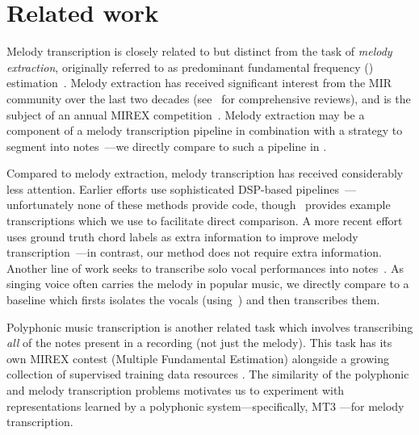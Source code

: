 \section{Related work}\label{sec:related}

Melody transcription is closely related to but distinct from the task of \emph{melody extraction}, originally referred to as predominant fundamental frequency (\fnot) estimation~\cite{goto1999real,goto2004real}. 
Melody extraction has received significant interest from the MIR community over the last two decades (see~\cite{salamon2014melody,rao2022melody} for comprehensive reviews), 
and is the subject of an annual MIREX competition~\cite{downie2014ten}. 
Melody extraction may be a component of a melody transcription pipeline in combination with a strategy to segment \fnot{} into notes~\cite{salamon2015midi,nishikimi2016musical,nishikimi2017scale}---we directly compare to such a pipeline in .

Compared to melody extraction, melody transcription has received considerably less attention. 
Earlier efforts use sophisticated DSP-based pipelines~\cite{paiva2004auditory,paiva2005detection,ryynanen2008automatic,weil2009automatic}---unfortunately none of these methods provide code, though~\cite{ryynanen2008automatic} provides example transcriptions which we use to facilitate direct comparison. 
A more recent effort uses ground truth chord labels as extra information to improve melody transcription~\cite{laaksonen2014automatic}---in contrast, our method does not require extra information. 
Another line of work seeks to transcribe solo vocal performances into notes~\cite{mauch2015computer,nishikimi2020bayesian,nishikimi2021audio}. 
As singing voice often carries the melody in popular music, we directly compare to a baseline which firsts isolates the vocals (using~\cite{hennequin2020spleeter}) and then transcribes them.

Polyphonic music transcription is another related task which involves transcribing \emph{all} of the notes present in a recording (not just the melody).
This task has its own MIREX contest (Multiple Fundamental \fnot{} Estimation) alongside a growing collection of supervised training data resources \cite{benetos2013automatic,thickstun2017learning,hawthorne2019enabling,manilow2019cutting}. 
The similarity of the polyphonic and melody transcription problems motivates us to experiment with representations learned by a polyphonic system---specifically, MT3 \cite{gardner2021mt3}---for melody transcription.